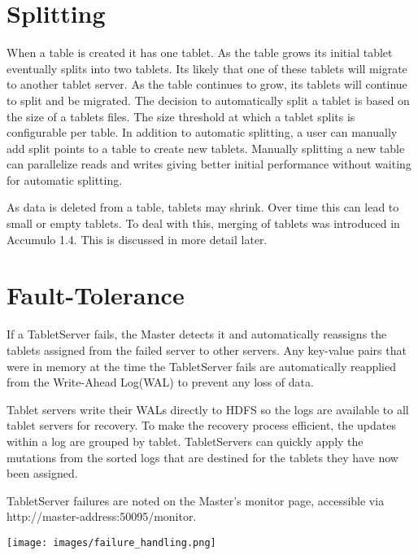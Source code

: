 \section{Splitting}

When a table is created it has one tablet. As the table grows its initial
tablet eventually splits into two tablets. Its likely that one of these
tablets will migrate to another tablet server. As the table continues to grow,
its tablets will continue to split and be migrated. The decision to
automatically split a tablet is based on the size of a tablets files. The
size threshold at which a tablet splits is configurable per table. In addition
to automatic splitting, a user can manually add split points to a table to
create new tablets. Manually splitting a new table can parallelize reads and
writes giving better initial performance without waiting for automatic
splitting.

As data is deleted from a table, tablets may shrink. Over time this can lead
to small or empty tablets. To deal with this, merging of tablets was
introduced in Accumulo 1.4. This is discussed in more detail later.

\section{Fault-Tolerance}

If a TabletServer fails, the Master detects it and automatically reassigns the tablets
assigned from the failed server to other servers. Any key-value pairs that were in
memory at the time the TabletServer fails are automatically reapplied from the Write-Ahead
Log(WAL) to prevent any loss of data.

Tablet servers write their WALs directly to HDFS so the logs are available to all tablet
servers for recovery. To make the recovery process efficient, the updates within a log are
grouped by tablet.  TabletServers can quickly apply the mutations from the sorted logs
that are destined for the tablets they have now been assigned.

TabletServer failures are noted on the Master's monitor page, accessible via\\
\mbox{http://master-address:50095/monitor}.

\begin{center}
\texttt{[image: images/failure\_handling.png]}
\end{center}


